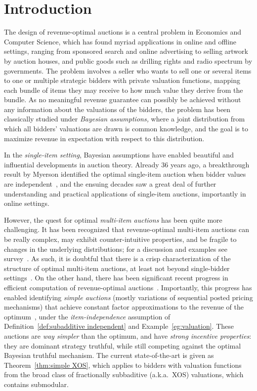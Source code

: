 \section{Introduction} \label{sec:intro}

The design of revenue-optimal auctions is a central problem in Economics and Computer Science, which has found myriad applications in online and offline settings, ranging from sponsored search and online advertising to selling artwork by auction houses, and public goods such as drilling rights and radio spectrum by governments. The problem involves a seller who wants to sell one or several items to one or multiple strategic bidders with private valuation functions, mapping each bundle of items they may receive to how much value they derive from the bundle. As no meaningful revenue guarantee can possibly be achieved without any information about the valuations of the bidders, the problem has been classically studied under {\em Bayesian assumptions,} where a joint distribution from which all bidders' valuations are drawn is common knowledge, and the goal is to maximize  revenue in expectation with respect to this distribution. 

In the {\em single-item setting}, Bayesian assumptions have enabled beautiful and influential developments in auction theory. Already 36 years ago, a breakthrough result by Myerson identified the optimal single-item auction when bidder values are independent~\cite{Myerson81}, and the ensuing decades saw a great deal of further understanding and practical applications of single-item auctions, importantly in online settings. 

However, the quest for optimal {\em multi-item auctions} has been quite more challenging. It has been recognized that revenue-optimal multi-item auctions can be really complex, may exhibit counter-intuitive properties, and be fragile to changes in the underlying distributions; for a discussion and examples see survey~\cite{Daskalakis15}. As such, it is doubtful that there is a crisp characterization of the structure of optimal multi-item auctions, at least not beyond single-bidder settings~\cite{DaskalakisDT17}. On the other hand, there has been significant recent progress in efficient computation of revenue-optimal auctions~\cite{ChawlaHK07,ChawlaHMS10,Alaei11,CaiD11b,AlaeiFHHM12,CaiDW12a,CaiDW12b,CaiH13,CaiDW13b,AlaeiFHHM13,BhalgatGM13,DaskalakisDW15}. Importantly, this progress has enabled identifying {\em simple auctions} (mostly variations of sequential posted pricing mechanisms) that achieve constant factor approximations to the revenue of the optimum~\cite{BabaioffILW14,Yao15,CaiDW16,ChawlaM16, CaiZ17}, under the {\em item-independence} assumption of Definition~\ref{def:subadditive independent} and Example~\ref{eg:valuation}. These auctions are {\em way simpler} than the optimum, and have {\em strong incentive properties}: they are dominant strategy truthful, while still competing against the optimal Bayesian truthful mechanism. The current state-of-the-art is given as Theorem~\ref{thm:simple XOS}, which applies to bidders with valuation functions from the broad class of fractionally subbaditive (a.k.a.~XOS) valuations, which contains submodular.

